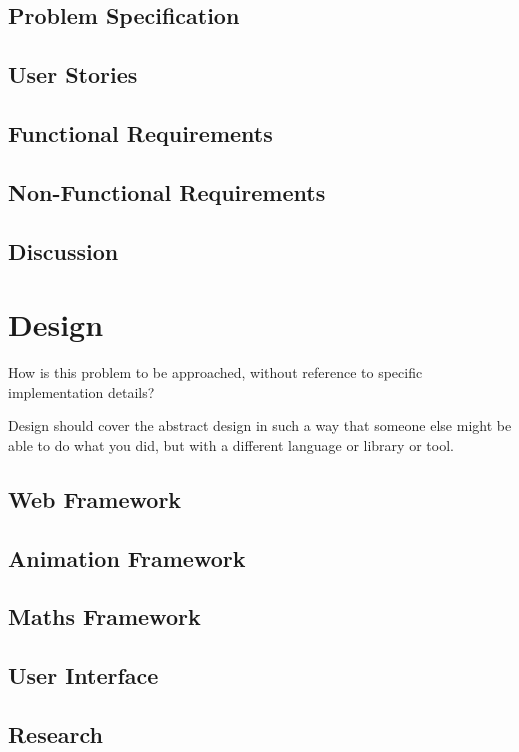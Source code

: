 \documentclass{l4proj}
\begin{document}
\section{Problem Specification}
\section{User Stories}
\section{Functional Requirements}
\section{Non-Functional Requirements}
\section{Discussion}
\chapter{Design}
How is this problem to be approached, without reference to specific implementation 
details? 

Design should cover the abstract design in such a way that someone else might be able to do what you did, but with a different language or library or tool.

\section{Web Framework}
\section{Animation Framework}
\section{Maths Framework}

\section{User Interface}

\section{Research}
\end{document}
